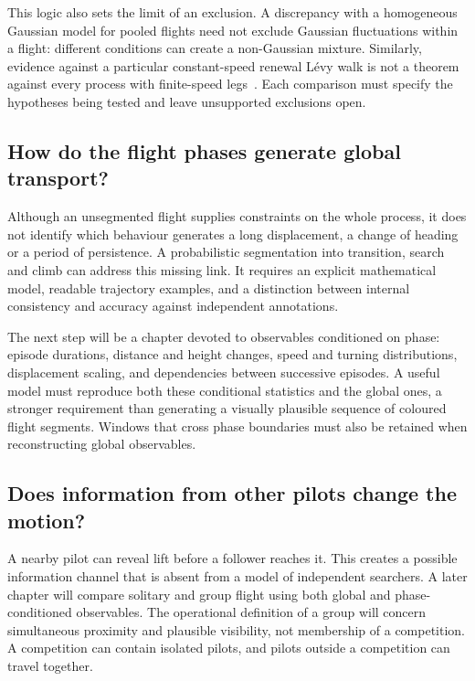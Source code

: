 This logic also sets the limit of an exclusion. A discrepancy with a homogeneous Gaussian
model for pooled flights need not exclude Gaussian fluctuations within a flight: different
conditions can create a non-Gaussian mixture. Similarly, evidence against a particular
constant-speed renewal L\'evy walk is not a theorem against every process with finite-speed
legs~\cite{zaburdaev2015}. Each comparison must specify the hypotheses being tested
and leave unsupported exclusions open.

\subsection{How do the flight phases generate global transport?}

Although an unsegmented flight supplies constraints on the whole process, it does not
identify which behaviour generates a long displacement, a change of heading or a period
of persistence.
A probabilistic segmentation into transition, search and climb can address this
missing link. It requires an explicit mathematical model, readable trajectory
examples, and a distinction between internal consistency and accuracy against
independent annotations.

The next step will be a chapter devoted to observables conditioned on phase: episode
durations, distance and height changes, speed and turning distributions, displacement
scaling, and dependencies between successive episodes. A useful model must reproduce both
these conditional statistics and the global ones, a stronger requirement than generating
a visually plausible sequence of coloured flight segments. Windows that cross
phase boundaries must also be retained when reconstructing global observables.

\subsection{Does information from other pilots change the motion?}

A nearby pilot can reveal lift before a follower reaches it. This creates a possible
information channel that is absent from a model of independent searchers. A later chapter
will compare solitary and group flight using both global and phase-conditioned observables.
The operational definition of a group will concern simultaneous proximity and plausible
visibility, not membership of a competition. A competition can contain isolated pilots,
and pilots outside a competition can travel together.

